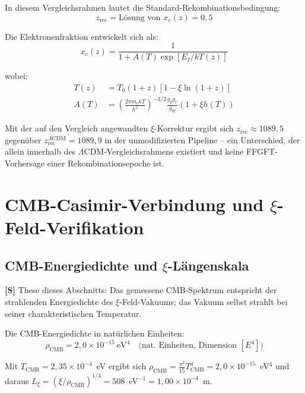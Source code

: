 	In diesem Vergleichsrahmen lautet die Standard-Rekombinationsbedingung:
	\begin{equation}
		z_{\text{rec}} = \text{Lösung von } x_e(z) = 0,5
	\end{equation}

	Die Elektronenfraktion entwickelt sich als:
	\begin{equation}
		x_e(z) = \frac{1}{1 + A(T) \exp[E_I/kT(z)]}
	\end{equation}

	wobei:
	\begin{align}
		T(z) &= T_0(1+z)[1 - \xi\ln(1+z)] \\
		A(T) &= \left(\frac{2\pi m_e kT}{h^2}\right)^{-3/2} 
		\frac{g_p g_e}{g_H} (1 + \xi h(T))
	\end{align}

	Mit der auf den Vergleich angewandten $\xi$-Korrektur ergibt sich
	$z_{\text{rec}} \approx 1089,5$ gegenüber
	$z_{\text{rec}}^{\Lambda\text{CDM}} = 1089,9$ in der unmodifizierten Pipeline
	-- ein Unterschied, der allein innerhalb des $\Lambda$CDM-Vergleichsrahmens
	existiert und keine FFGFT-Vorhersage einer Rekombinationsepoche ist.

	
	\section{CMB-Casimir-Verbindung und $\xi$-Feld-Verifikation}
	\label{sec:cmb_casimir}
	
	\subsection{CMB-Energiedichte und $\xi$-Längenskala}
	
	\begin{important}[These]
		\textbf{[S]} These dieses Abschnitts: Das gemessene CMB-Spektrum entspricht der strahlenden Energiedichte des $\xi$-Feld-Vakuums; das Vakuum selbst strahlt bei seiner charakteristischen Temperatur.
	\end{important}
	
	Die CMB-Energiedichte in natürlichen Einheiten:
	\begin{equation}
		\rho_{\text{CMB}} = 2,0 \times 10^{-15}\ \text{eV}^4 \quad \text{(nat. Einheiten, Dimension } [E^4] \text{)}
	\end{equation}
	
	Mit $T_{\text{CMB}} = 2,35 \times 10^{-4}$~eV ergibt sich $\rho_{\text{CMB}} = \frac{\pi^2}{15} T_{\text{CMB}}^4 = 2,0 \times 10^{-15}$~eV$^4$ und daraus $L_\xi = (\xi/\rho_{\text{CMB}})^{1/4} = 508$~eV$^{-1} = 1,00 \times 10^{-4}$~m.
	
